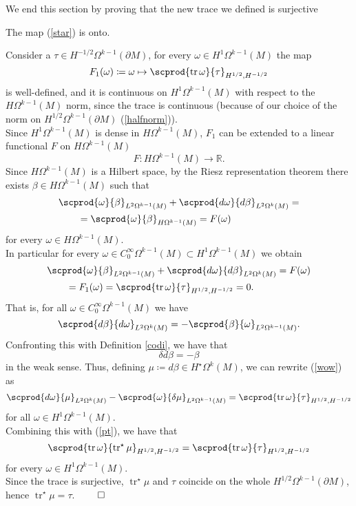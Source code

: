 \documentclass{ifacconf}
\newcommand{\R}{\mathbb{R}}
\newcommand{\tr}{\operatorname{tr}}
\newcommand{\drh}[2]{\Omega^{#2}(#1)}
\begin{document}
We end this section by proving that the new trace we defined is surjective
\begin{prop}\label{surj}
    The map (\ref{star}) is onto.
    \begin{pf}
        Consider a $\tau\in H^{-1/2}\drh{\partial M}{k-1}$, for every $\omega\in H^1\drh{M}{k-1}$ the map
        \begin{equation}\label{this}
            F_1(\omega)\coloneqq\omega \mapsto \scprod{\tr\omega}{\tau}_{H^{1/2},H^{-1/2}}
        \end{equation}
        is well-defined, and it is continuous on $H^1\drh{M}{k-1}$ with respect to the $H\drh{M}{k-1}$ norm, since the trace is continuous (because of our choice of the norm on $H^{1/2}\drh{\partial M}{k-1}$ (\ref{halfnorm})).\\
        Since $H^1\drh{M}{k-1}$ is dense in $H\drh{M}{k-1}$, $F_1$ can be extended to a linear functional $F$ on $H\drh{M}{k-1}$
        \[
            F\colon H\drh{M}{k-1}\to \R.
        \]
        Since $H\drh{M}{k-1}$ is a Hilbert space, by the Riesz representation theorem there exists $\beta\in H\drh{M}{k-1}$ such that
        \begin{align}\label{wow}
            \MoveEqLeft
            \scprod{\omega}{\beta}_{L^2\drh{M}{k-1}}+\scprod{d\omega}{d\beta}_{L^2\drh{M}{k}}=\nonumber \\
            &=\scprod{\omega}{\beta}_{H\drh{M}{k-1}}=F(\omega)
        \end{align}
        for every $\omega\in H\drh{M}{k-1}$.\\
        In particular for every $\omega\in C^{\infty}_0\drh{M}{k-1}\subset H^1\drh{M}{k-1}$ we obtain
        \begin{align*}
            \MoveEqLeft
            \scprod{\omega}{\beta}_{L^2\drh{M}{k-1}}+\scprod{d\omega}{d\beta}_{L^2\drh{M}{k}}=F(\omega)\\
            &= F_1(\omega)=\scprod{\tr\omega}{\tau}_{H^{1/2},H^{-1/2}}=0.
        \end{align*}
        That is, for all $\omega\in C^{\infty}_0\drh{M}{k-1}$ we have
        \[
            \scprod{d\beta}{d\omega}_{L^2\drh{M}{k}}=-\scprod{\beta}{\omega}_{L^2\drh{M}{k-1}}.
        \]
        Confronting this with Definition \ref{codi}, we have that
        \[
            \delta d\beta=-\beta
        \]
        in the weak sense. Thus, defining $\mu\coloneqq d\beta\in H^{\star}\drh{M}{k}$, we can rewrite (\ref{wow}) as 
        \[
            \scprod{d\omega}{\mu}_{L^2\drh{M}{k}}-\scprod{\omega}{\delta\mu}_{L^2\drh{M}{k-1}}= \scprod{\tr\omega}{\tau}_{H^{1/2},H^{-1/2}}
        \]
        for all $\omega\in H^1\drh{M}{k-1}$.\\
        Combining this with (\ref{pt}), we have that 
        \[
            \scprod{\tr\omega}{\tr^{\star}\mu}_{H^{1/2},H^{-1/2}}=\scprod{\tr\omega}{\tau}_{H^{1/2},H^{-1/2}}
        \]
        for every $\omega\in H^1\drh{M}{k-1}$.\\
        Since the trace is surjective, $\tr^{\star}\mu$ and $\tau$ coincide on the whole $H^{1/2}\drh{\partial M}{k-1}$, hence $\tr^{\star}\mu=\tau$.
        \hfill $\qed$
    \end{pf}
\end{prop}
\end{document}
